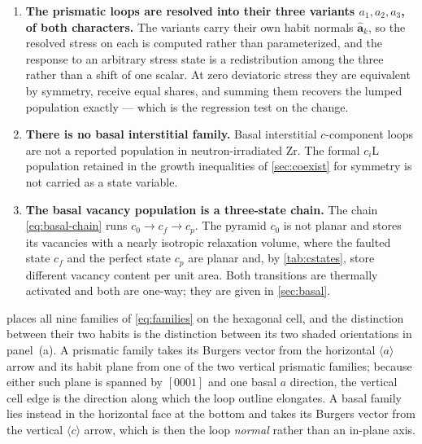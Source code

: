 \documentclass{article}
\newcommand{\ciL}{c_{i}\mathrm{L}}
\begin{document}
\begin{enumerate}
\item \textbf{The prismatic loops are resolved into their three variants
      $a_1,a_2,a_3$, of both characters.} The variants carry their own habit
      normals $\hat{\bm a}_k$, so the resolved stress on each is computed rather
      than parameterized, and the response to an arbitrary stress state is a
      redistribution among the three rather than a shift of one scalar. At zero
      deviatoric stress they are equivalent by symmetry, receive equal shares,
      and summing them recovers the lumped population exactly --- which is the
      regression test on the change.
\item \textbf{There is no basal interstitial family.} Basal interstitial
      $c$-component loops are not a reported population in neutron-irradiated
      Zr. The formal $\ciL$ population retained in the growth inequalities of
      \cref{sec:coexist} for symmetry is not carried as a state variable.
\item \textbf{The basal vacancy population is a three-state chain.} The chain
      \cref{eq:basal-chain} runs $c_0\to c_f\to c_p$. The pyramid $c_0$ is not
      planar and stores its vacancies with a nearly isotropic relaxation volume,
      where the faulted state $c_f$ and the perfect state $c_p$ are planar and,
      by \cref{tab:cstates}, store different vacancy content per unit area. Both
      transitions are thermally activated and both are one-way; they are given in
      \cref{sec:basal}.
\end{enumerate}

 places all nine families of \cref{eq:families} on the
hexagonal cell, and the distinction between their two habits is the distinction
between its two shaded orientations in panel~(a). A prismatic family takes its
Burgers vector from the horizontal $\langle a\rangle$ arrow and its habit plane
from one of the two vertical prismatic families; because either such plane is
spanned by $[0001]$ and one basal $a$ direction, the vertical cell edge is the
direction along which the loop outline elongates. A basal family lies instead in
the horizontal face at the bottom and takes its Burgers vector from the vertical
$\langle c\rangle$ arrow, which is then the loop \emph{normal} rather than an
in-plane axis.
\end{document}
